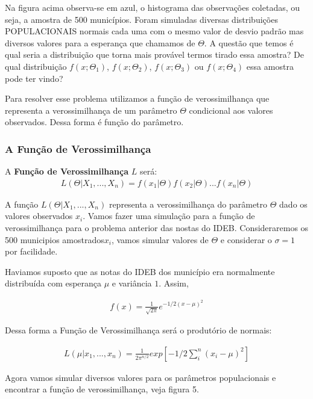 \documentclass[
  letterpaper,
  DIV=11,
  numbers=noendperiod]{scrartcl}
\begin{document}
Na figura acima observa-se em azul, o histograma das observações
coletadas, ou seja, a amostra de 500 municípios. Foram simuladas
diversas distribuições POPULACIONAIS normais cada uma com o mesmo valor
de desvio padrão mas diversos valores para a esperança que chamamos de
\(\Theta\). A questão que temos é qual seria a distribuição que torna
mais provável termos tirado essa amostra? De qual distribuição
\(f(x;\Theta_1)\), \(f(x;\Theta_2)\), \(f(x;\Theta_3)\) ou
\(f(x;\Theta_4)\) essa amostra pode ter vindo?

Para resolver esse problema utilizamos a função de verossimilhança que
representa a verossimilhança de um parâmetro \(\Theta\) condicional aos
valores observados. Dessa forma é função do parâmetro.

\subsubsection{A Função de
Verossimilhança}\label{a-funuxe7uxe3o-de-verossimilhanuxe7a}

A \textbf{Função de Verossimilhança} \(L\) será: \[\begin{array}{ccc}
L(\Theta|X_1,...,X_n)= f(x_1|\Theta)f(x_2|\Theta)...f(x_n|\Theta)
\end{array}\]

A função \(L(\Theta|X_1,...,X_n)\) representa a verossimilhança do
parâmetro \(\Theta\) dado os valores observados \(x_i\). Vamos fazer uma
simulação para a função de verossimilhança para o problema anterior das
nostas do IDEB. Consideraremos os 500 municipios amostrados\(x_i\),
vamos simular valores de \(\Theta\) e considerar o \(\sigma=1\) por
facilidade.

Haviamos suposto que as notas do IDEB dos município era normalmente
distribuída com esperança \(\mu\) e variância \(1\). Assim,

\[\begin{array}{ccc}
f(x)=\frac{1}{\sqrt{2 \pi}} e^{-1/2 (x-\mu)^2}
\end{array}\]

Dessa forma a Função de Verossimilhança será o produtório de normais:

\[\begin{array}{ccc}
L(\mu| x_1,...,x_n)= \frac{1}{2 \pi ^{n/2}} exp[-1/2 \sum_i^n (x_i - \mu)^2 ]
\end{array}\]

Agora vamos simular diversos valores para os parâmetros populacionais e
encontrar a função de verossimilhança, veja figura 5.
\end{document}
